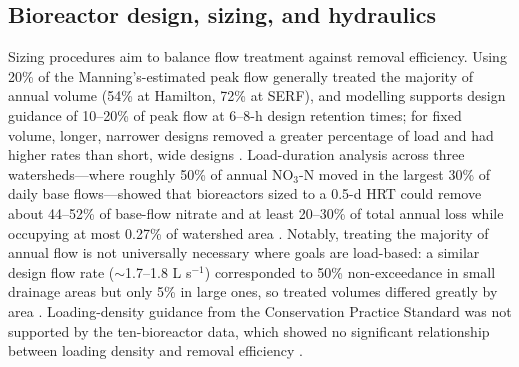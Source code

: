 \documentclass[11pt]{article}
\begin{document}
\subsection{Bioreactor design, sizing, and hydraulics}

Sizing procedures aim to balance flow treatment against removal efficiency. Using 20\% of the Manning's-estimated peak flow generally treated the majority of annual volume (54\% at Hamilton, 72\% at SERF), and modelling supports design guidance of 10--20\% of peak flow at 6--8-h design retention times; for fixed volume, longer, narrower designs removed a greater percentage of load and had higher rates than short, wide designs \parencite{Christianson2013}. Load-duration analysis across three watersheds---where roughly 50\% of annual NO$_3$-N moved in the largest 30\% of daily base flows---showed that bioreactors sized to a 0.5-d HRT could remove about 44--52\% of base-flow nitrate and at least 20--30\% of total annual loss while occupying at most 0.27\% of watershed area \parencite{Moorman2015}. Notably, treating the majority of annual flow is not universally necessary where goals are load-based: a similar design flow rate ($\sim$1.7--1.8 L s$^{-1}$) corresponded to 50\% non-exceedance in small drainage areas but only 5\% in large ones, so treated volumes differed greatly by area \parencite{Christianson2025}. Loading-density guidance from the Conservation Practice Standard was not supported by the ten-bioreactor data, which showed no significant relationship between loading density and removal efficiency \parencite{Christianson2026}.
\end{document}
